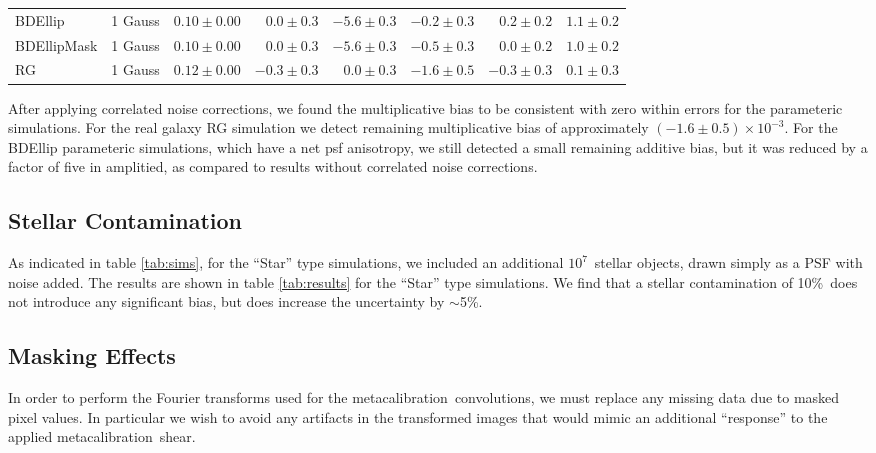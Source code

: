 \documentclass[usegraphicx,usenatbib]{mn2e}
\newcommand{\mcal}{metacalibration}
\newcommand{\nsimNstar}{$10^7$}
\newcommand{\nsimNstarperc}{10\%}
\newcommand{\rgbias}{$(-1.6 \pm 0.5) \times 10^{-3}$}
\begin{document}
\begin{table}
\begin{tabular}{ |l|  |c| c|r|r|  r|r|r|}
        BDEllip         & 1 Gauss & $0.10 \pm 0.00$ & $0.0 \pm 0.3$ & $-5.6 \pm 0.3$    & $-0.2 \pm 0.3$ & $0.2 \pm 0.2$ & $1.1 \pm 0.2$  \\
        BDEllipMask     & 1 Gauss & $0.10 \pm 0.00$ & $0.0 \pm 0.3$ & $-5.6 \pm 0.3$    & $-0.5 \pm 0.3$ & $0.0 \pm 0.2$ & $1.0 \pm 0.2$  \\
        RG              & 1 Gauss & $0.12 \pm 0.00$ & $-0.3 \pm 0.3$ & $0.0 \pm 0.3$      & $-1.6 \pm 0.5$ & $-0.3 \pm 0.3$ & $0.1 \pm 0.3$  \\
    \end{tabular}
\end{table}

After applying correlated noise corrections, we found the multiplicative bias
to be consistent with zero within errors for the parameteric simulations. For
the real galaxy RG simulation we detect remaining multiplicative bias of
approximately \rgbias.  For the BDEllip parameteric simulations, which have a
net psf anisotropy, we still detected a small remaining additive bias, but it
was reduced by a factor of five in amplitied, as compared to results without
correlated noise corrections.

\subsection{Stellar Contamination} \label{sec:stars}

As indicated in table \ref{tab:sims}, for the ``Star'' type simulations, we
included an additional \nsimNstar\ stellar objects, drawn simply as a PSF with
noise added.  The results are shown in table \ref{tab:results} for the ``Star''
type simulations.  We find that a stellar contamination of 
\nsimNstarperc\ does not introduce any significant bias, but does
increase the uncertainty by $\sim$5\%.

\subsection{Masking Effects} \label{sec:masking}

In order to perform the Fourier transforms used for the \mcal\ convolutions, we
must replace any missing data due to masked pixel values.  In particular we
wish to avoid any artifacts in the transformed images that would mimic an
additional ``response'' to the applied \mcal\ shear.
\end{document}
